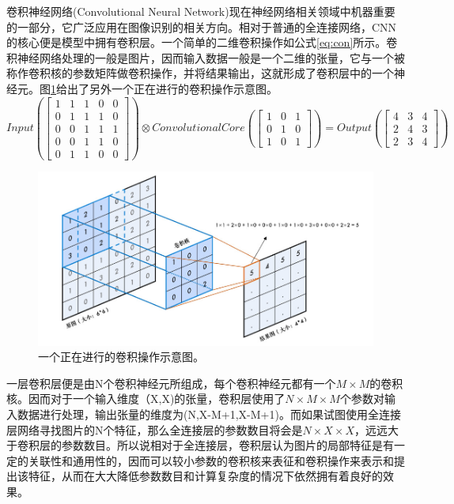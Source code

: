 卷积神经网络(Convolutional Neural Network)现在神经网络相关领域中机器重要的一部分，它广泛应用在图像识别的相关方向。相对于普通的全连接网络，CNN的核心便是模型中拥有卷积层。一个简单的二维卷积操作如公式\ref{eq:con}所示。卷积神经网络处理的一般是图片，因而输入数据一般是一个二维的张量，它与一个被称作卷积核的参数矩阵做卷积操作，并将结果输出，这就形成了卷积层中的一个神经元。图\ref{fig:con}给出了另外一个正在进行的卷积操作示意图。
\renewcommand\arraystretch{1.0}
\begin{equation}
    Input(\left[ \begin{array}{ccccc}
        1&1&1&0&0\\
        0&1&1&1&0\\
        0&0&1&1&1\\
        0&0&1&1&0\\
        0&1&1&0&0
    \end{array} \right])
    \otimes Convolutional Core(\left[ \begin{array}{ccc}
        1&0&1\\
        0&1&0\\
        1&0&1
    \end{array} \right]) = Output(\left[ \begin{array}{ccc}
        4 &3 &4\\
        2 &4&3\\
        2&3&4
    \end{array} \right])
    \label{eq:con}
\end{equation}

\begin{figure}
    \centering
    \includegraphics[width=0.7\columnwidth]{pic/con.jpg}
    \caption{一个正在进行的卷积操作示意图\supercite{con}。}
    \label{fig:con}
\end{figure}

一层卷积层便是由N个卷积神经元所组成，每个卷积神经元都有一个$M \times M$的卷积核。因而对于一个输入维度（X,X)的张量，卷积层使用了$N\times M\times M$个参数对输入数据进行处理，输出张量的维度为(N,X-M+1,X-M+1)。而如果试图使用全连接层网络寻找图片的N个特征，那么全连接层的参数数目将会是$N\times X\times X$，远远大于卷积层的参数数目。所以说相对于全连接层，卷积层认为图片的局部特征是有一定的关联性和通用性的，因而可以较小参数的卷积核来表征和卷积操作来表示和提出该特征，从而在大大降低参数数目和计算复杂度的情况下依然拥有着良好的效果。

